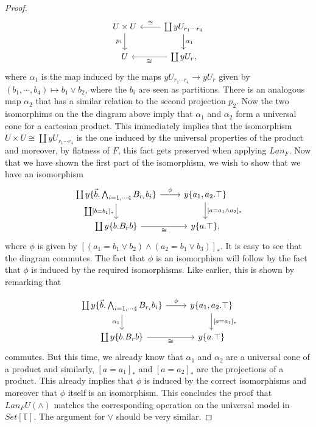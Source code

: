 \documentclass[a4paper]{amsproc}
\theoremstyle{plain}
\theoremstyle{definition}
\theoremstyle{remark}
\numberwithin{equation}{section}
\begin{document}
\begin{proof}
\[
\begin{tikzcd}
U \times U \arrow[d, "p_1"'] & \coprod y U_{r_1 \cdots r_4} \arrow[d, "\alpha_1"] \arrow[l, "\cong"'] \\
U                            & \coprod y U_r \arrow[l, "\cong"]                                    ,
\end{tikzcd}
\]
where $\alpha_1$ is the map induced by the maps $y U_{r_1 \cdots r_4} \to y U_r$ given by $(b_1,\cdots,b_4) \mapsto b_1 \vee b_2$, where the $b_i$ are seen as partitions. There is an analogous map $\alpha_2$ that has a similar relation to the second projection $p_2$. Now the two isomorphims on the the diagram above imply that $\alpha_1$ and $\alpha_2$ form a universal cone for a cartesian product. This immediately implies that the isomorphism $U \times U \cong \coprod y U_{r_1 \cdots r_4}$ is the one induced by the universal properties of the product and moreover, by flatness of $F$, this fact gets preserved when applying $Lan_F$. Now that we have shown the first part of the isomorphism, we wish to show that we have an isomorphism
\[
\begin{tikzcd}
{\coprod y \{\vec{b}.\bigwedge_{i=1,\cdots 4} B_{r_i} b_i\}} \arrow[d, "{\coprod [b = b_1]_*}"'] \arrow[r, "\phi"] & {y \{a_1,a_2.\top\}} \arrow[d, "{[a = a_1 \wedge a_2]_*}"] \\
\coprod y \{b.B_rb\} \arrow[r, "\cong"']                                                & y\{a.\top\}                                               ,
\end{tikzcd}
\]
where $\phi$ is given by $[(a_1 = b_1 \vee b_2) \wedge (a_2 = b_1 \vee b_3)]_*$. It is easy to see that the diagram commutes. The fact that $\phi$ is an isomorphism will follow by the fact that $\phi$ is induced by the required isomorphisms. Like earlier, this is shown by remarking that

\[
\begin{tikzcd}
{\coprod y \{\vec{b}.\bigwedge_{i=1,\cdots 4} B_{r_i} b_i\}} \arrow[d, "\alpha_1"'] \arrow[r, "\phi"] & {y \{a_1,a_2.\top\}} \arrow[d, "{[a = a_1]_*}"] \\
\coprod y \{b.B_rb\} \arrow[r, "\cong"']                                                            & y\{a.\top\}
\end{tikzcd}
\]
commutes. But this time, we already know that $\alpha_1$ and $\alpha_2$ are a universal cone of a product and similarly, $[a=a_1]_*$ and $[a=a_2]_*$ are the projections of a product. This already implies that $\phi$ is induced by the correct isomorphisms and moreover that $\phi$ itself is an isomorphism. This concludes the proof that $Lan_F U(\wedge)$ matches the corresponding operation on the universal model in $Set[\mathbb{T}]$. The argument for $\vee$ should be very similar.


\end{proof}
\end{document}
